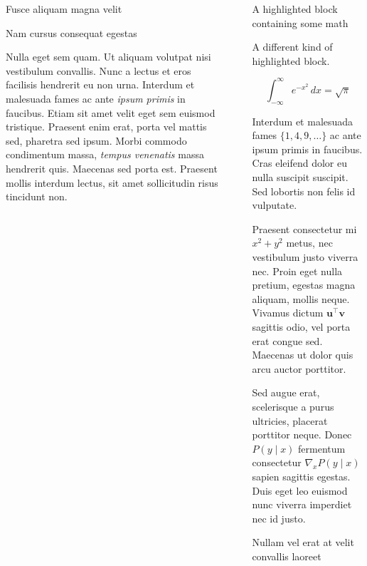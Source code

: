 \documentclass[final]{beamer}
\newlength{\sepwidth}
\newlength{\colwidth}
\newcommand{\separatorcolumn}{\begin{column}{\sepwidth}\end{column}}
\begin{document}
\begin{frame}[t]
\begin{columns}[t]
\begin{column}{\colwidth}
\begin{block}{Fusce aliquam magna velit}
  \end{block}

  \begin{block}{Nam cursus consequat egestas}

    Nulla eget sem quam. Ut aliquam volutpat nisi vestibulum convallis. Nunc a
    lectus et eros facilisis hendrerit eu non urna. Interdum et malesuada fames
    ac ante \textit{ipsum primis} in faucibus. Etiam sit amet velit eget sem
    euismod tristique. Praesent enim erat, porta vel mattis sed, pharetra sed
    ipsum. Morbi commodo condimentum massa, \textit{tempus venenatis} massa
    hendrerit quis. Maecenas sed porta est. Praesent mollis interdum lectus,
    sit amet sollicitudin risus tincidunt non.

  \end{block}

\end{column}

\separatorcolumn

\begin{column}{\colwidth}

  \begin{exampleblock}{A highlighted block containing some math}

    A different kind of highlighted block.

    $$
    \int_{-\infty}^{\infty} e^{-x^2}\,dx = \sqrt{\pi}
    $$

    Interdum et malesuada fames $\{1, 4, 9, \ldots\}$ ac ante ipsum primis in
    faucibus. Cras eleifend dolor eu nulla suscipit suscipit. Sed lobortis non
    felis id vulputate.


    Praesent consectetur mi $x^2 + y^2$ metus, nec vestibulum justo viverra
    nec. Proin eget nulla pretium, egestas magna aliquam, mollis neque. Vivamus
    dictum $\mathbf{u}^\intercal\mathbf{v}$ sagittis odio, vel porta erat
    congue sed. Maecenas ut dolor quis arcu auctor porttitor.


    Sed augue erat, scelerisque a purus ultricies, placerat porttitor neque.
    Donec $P(y \mid x)$ fermentum consectetur $\nabla_x P(y \mid x)$ sapien
    sagittis egestas. Duis eget leo euismod nunc viverra imperdiet nec id
    justo.

  \end{exampleblock}

  \begin{block}{Nullam vel erat at velit convallis laoreet}


\end{block}
\end{column}
\end{columns}
\end{frame}
\end{document}
